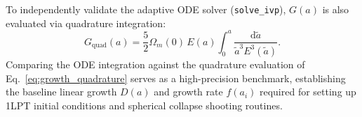 To independently validate the adaptive ODE solver (\texttt{solve\_ivp}), $G(a)$ is also evaluated via quadrature integration:
    \begin{equation}
        G_{\mathrm{quad}}(a) = \frac{5}{2}\Omega_m(0)\, E(a) \int_{0}^{a} \frac{\mathrm{d}\tilde{a}}{\tilde{a}^3 E^3(\tilde{a})}.
        \label{eq:growth_quadrature}
    \end{equation}
Comparing the ODE integration against the quadrature evaluation of Eq.~\eqref{eq:growth_quadrature} serves as a high-precision benchmark, establishing the baseline linear growth $D(a)$ and growth rate $f(a_i)$ required for setting up 1LPT initial conditions and spherical collapse shooting routines.